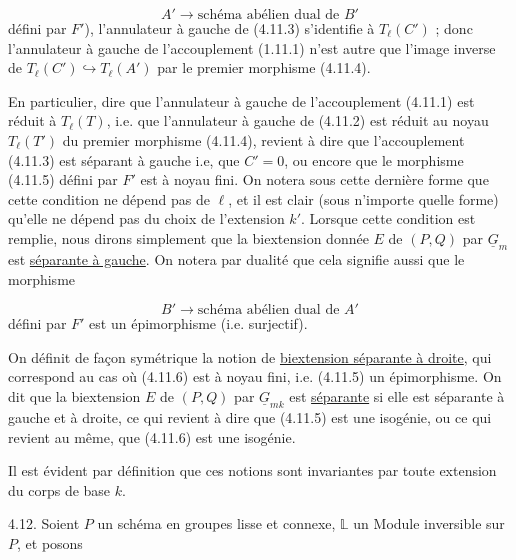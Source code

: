 \begin{equation}\tag{4.11.5}
A' \longrightarrow \text{schéma abélien dual de } B'
\end{equation}
défini par $F'$), l'annulateur à gauche de (4.11.3) s'identifie à $T_{\ell}(C')$ ; donc l'annulateur à gauche de l'accouplement (1.11.1) n'est autre que l'image inverse de $T_{\ell}(C') \hookrightarrow T_{\ell}(A')$ par le premier morphisme (4.11.4).

En particulier, dire que l'annulateur à gauche de l'accouplement (4.11.1) est réduit à $T_{\ell}(T)$, i.e. que l'annulateur à gauche de (4.11.2) est réduit au noyau $T_{\ell}(T')$ du premier morphisme (4.11.4), revient à dire que l'accouplement (4.11.3) est séparant à gauche i.e, que $C' = 0$, ou encore que le morphisme (4.11.5) défini par $F'$ est à noyau fini. On notera sous cette dernière forme que cette condition ne dépend pas de $\ell$, et il est clair (sous n'importe quelle forme) qu'elle ne dépend pas du choix de l'extension $k'$. Lorsque cette condition est remplie, nous dirons simplement que la biextension donnée $E$ de $(P,Q)$ par $\underline{G}_m$ est \underline{séparante à gauche}. On notera par dualité que cela signifie aussi que le morphisme

\begin{equation}\tag{4.11.6}
B' \longrightarrow \text{schéma abélien dual de } A'
\end{equation}
défini par $F'$ est un épimorphisme (i.e. surjectif).



On définit de façon symétrique la notion de \underline{biextension séparante à droite}, qui correspond au cas où (4.11.6) est à noyau fini, i.e. (4.11.5) un épimorphisme. On dit que la biextension $E$ de $(P,Q)$ par $\underline{G}_{mk}$ est \underline{séparante} si elle est séparante à gauche et à droite, ce qui revient à dire que (4.11.5) est une isogénie, ou ce qui revient au même, que (4.11.6) est une isogénie.

Il est évident par définition que ces notions sont invariantes par toute extension du corps de base $k$.

4.12. Soient $P$ un schéma en groupes lisse et connexe, $\mathbb{L}$ un Module inversible sur $P$, et posons


